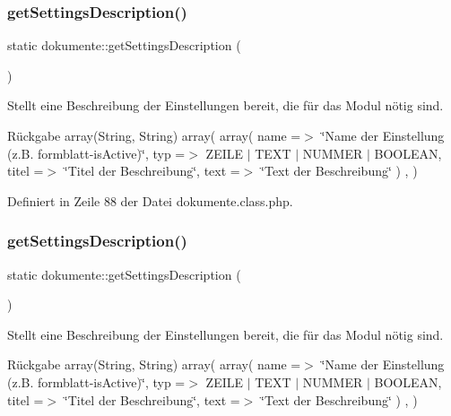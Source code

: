 \subsubsection{\texorpdfstring{get\+Settings\+Description()}{getSettingsDescription()}\hspace{0.1cm}{\footnotesize\ttfamily [1/2]}}
{\footnotesize\ttfamily static dokumente\+::get\+Settings\+Description (\begin{DoxyParamCaption}{ }\end{DoxyParamCaption})\hspace{0.3cm}{\ttfamily [static]}}

Stellt eine Beschreibung der Einstellungen bereit, die für das Modul nötig sind. \begin{DoxyReturn}{Rückgabe}
array(\+String, String) array( array( \textquotesingle{}name\textquotesingle{} =$>$ \char`\"{}\+Name der Einstellung (z.\+B. formblatt-\/is\+Active)\char`\"{}, \textquotesingle{}typ\textquotesingle{} =$>$ Z\+E\+I\+LE $\vert$ T\+E\+XT $\vert$ N\+U\+M\+M\+ER $\vert$ B\+O\+O\+L\+E\+AN, \textquotesingle{}titel\textquotesingle{} =$>$ \char`\"{}\+Titel der Beschreibung\char`\"{}, \textquotesingle{}text\textquotesingle{} =$>$ \char`\"{}\+Text der Beschreibung\char`\"{} ) , ) 
\end{DoxyReturn}


Definiert in Zeile 88 der Datei dokumente.\+class.\+php.

\mbox{\label{classdokumente_a541fbecd2c10b47527f7c5f5e5b61a33}} 
\subsubsection{\texorpdfstring{get\+Settings\+Description()}{getSettingsDescription()}\hspace{0.1cm}{\footnotesize\ttfamily [2/2]}}
{\footnotesize\ttfamily static dokumente\+::get\+Settings\+Description (\begin{DoxyParamCaption}{ }\end{DoxyParamCaption})\hspace{0.3cm}{\ttfamily [static]}}

Stellt eine Beschreibung der Einstellungen bereit, die für das Modul nötig sind. \begin{DoxyReturn}{Rückgabe}
array(\+String, String) array( array( \textquotesingle{}name\textquotesingle{} =$>$ \char`\"{}\+Name der Einstellung (z.\+B. formblatt-\/is\+Active)\char`\"{}, \textquotesingle{}typ\textquotesingle{} =$>$ Z\+E\+I\+LE $\vert$ T\+E\+XT $\vert$ N\+U\+M\+M\+ER $\vert$ B\+O\+O\+L\+E\+AN, \textquotesingle{}titel\textquotesingle{} =$>$ \char`\"{}\+Titel der Beschreibung\char`\"{}, \textquotesingle{}text\textquotesingle{} =$>$ \char`\"{}\+Text der Beschreibung\char`\"{} ) , ) 
\end{DoxyReturn}


